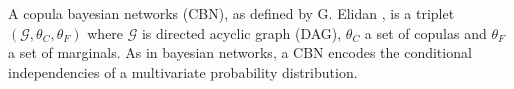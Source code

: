 A copula bayesian networks (CBN), as defined by G. Elidan
\cite{cbn_elidan_2010}, is a triplet $\left(\mathcal{G}, \theta_C,
\theta_F\right)$ where $\mathcal{G}$ is directed acyclic graph
(DAG), $\theta_C$ a set of copulas and $\theta_F$ a set of marginals.
As in bayesian networks, a CBN encodes the conditional independencies
of a multivariate probability distribution. 